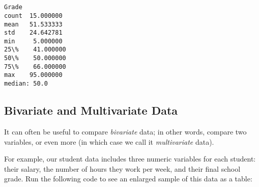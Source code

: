 \documentclass[11pt]{article}
\begin{document}
    \begin{center}
    \end{center}
    { \hspace*{\fill} \\}
    
    \begin{center}
    \end{center}
    { \hspace*{\fill} \\}
    
    \begin{Verbatim}[commandchars=\\\{\}]
           Grade
count  15.000000
mean   51.533333
std    24.642781
min     5.000000
25\%    41.000000
50\%    50.000000
75\%    66.000000
max    95.000000
median: 50.0

    \end{Verbatim}

    \subsection{Bivariate and Multivariate
Data}\label{bivariate-and-multivariate-data}

It can often be useful to compare \emph{bivariate} data; in other words,
compare two variables, or even more (in which case we call it
\emph{multivariate} data).

For example, our student data includes three numeric variables for each
student: their salary, the number of hours they work per week, and their
final school grade. Run the following code to see an enlarged sample of
this data as a table:
\end{document}
